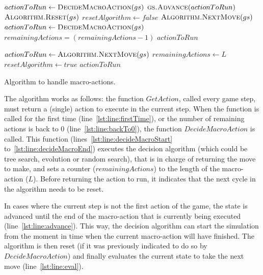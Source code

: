 \documentclass{sig-alternate}
\begin{document}
\begin{algorithm}[!ht]
\begin{algorithmic}[1]
		\State $actionToRun \gets \Call{DecideMacroAction}{gs}$ \label{lst:line:firstTime}
	\Else
			\State $\Call{gs.Advance}{actionToRun}$  \label{lst:line:advance}
		\EndFor 
				\State $\Call{Algorithm.Reset}{gs}$
				\State $resetAlgorithm \gets false$	
			\EndIf
			\State $\Call{Algorithm.NextMove}{gs}$ \label{lst:line:eval}
		\Else {}
			\State $actionToRun \gets \Call{DecideMacroAction}{gs}$ \label{lst:line:backTo0}
		\EndIf
	\EndIf
	\State $remainingActions = (remainingActions - 1)$
	\State \Return $actionToRun$
\EndFunction

\State
{} \label{lst:line:decideMacroStart}
	\State $actionToRun \gets \Call{Algorithm.NextMove}{gs}$
	\State $remainingActions \gets L$
	\State $resetAlgorithm \gets true$	
	\State \Return $actionToRun$ \label{lst:line:decideMacroEnd}
\EndFunction
\end{algorithmic}
\caption{Algorithm to handle macro-actions.}
\label{alg:macro}
\end{algorithm}

The algorithm works as follows: the function $GetAction$, called every game step, must return a (single) action to execute in the current step. When the function is called for the first time (line~\ref{lst:line:firstTime}), or the number of remaining actions is back to $0$ (line~\ref{lst:line:backTo0}), the function $DecideMacroAction$ is called. This function (lines~\ref{lst:line:decideMacroStart} to~\ref{lst:line:decideMacroEnd}) executes the decision algorithm (which could be tree search, evolution or random search), that is in charge of returning the move to make, and sets a counter ($remainingActions$) to the length of the macro-action ($L$). Before returning the action to run, it indicates that the next cycle in the algorithm needs to be reset.

In cases where the current step is not the first action of the game, the state is advanced until the end of the macro-action that is currently being executed (line~\ref{lst:line:advance}). This way, the decision algorithm can start the simulation from the moment in time when the current macro-action will have finished. The algorithm is then reset (if it was previously indicated to do so by $DecideMacroAction$) and finally evaluates the current state to take the next move (line~\ref{lst:line:eval}). 
\end{document}
